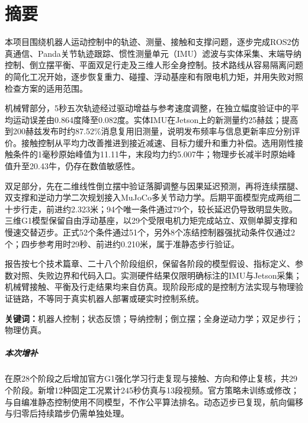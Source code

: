 \chapter*{摘要}
本项目围绕机器人运动控制中的轨迹、测量、接触和支撑问题，逐步完成ROS2仿真通信、Panda关节轨迹跟踪、惯性测量单元（IMU）滤波与实体采集、末端导纳控制、倒立摆平衡、平面双足行走及三维人形全身控制。技术路线从容易隔离问题的简化工况开始，逐步恢复重力、碰撞、浮动基座和有限电机力矩，并用失败对照检查方案的适用范围。

机械臂部分，5秒五次轨迹经过驱动增益与参考速度调整，在独立幅度验证中的平均运动误差由0.864度降至0.082度。实体IMU在Jetson上的新测量约25赫兹；提高到200赫兹发布时约87.52\%消息复用旧测量，说明发布频率与信息更新率应分别评价。接触控制从平均力改善推进到接近减速、目标力缓升和重力补偿。选用刚性接触条件的1毫秒原始峰值为11.11牛，末段均力约5.007牛；物理步长减半时原始峰值升至20.43牛，仍存在数值敏感性。

双足部分，先在二维线性倒立摆中验证落脚调整与因果延迟预测，再将连续摆腿、双支撑和逆动力学二次规划接入MuJoCo多关节动力学。后期平面模型完成两组二十步行走，前进约2.323米；94个唯一条件通过79个，较长延迟仍导致明显失败。三维G1模型保留自由浮动基座，以29个受限电机力矩完成站立、双侧单脚支撑和慢速交替迈步。正式52个条件通过51个，另外8个冻结控制器强扰动条件仅通过2个；四步参考用时29秒、前进约0.210米，属于准静态步行验证。

报告按七个技术篇章、二十八个阶段组织，保留各阶段的模型假设、指标定义、参数对照、失败边界和代码入口。实测硬件结果仅限明确标注的IMU与Jetson采集；机械臂接触、平衡及行走结果均来自仿真。现阶段形成的是控制方法实现与物理验证链路，不等同于真实机器人部署或硬实时控制系统。

\noindent\textbf{关键词：}机器人控制；状态反馈；导纳控制；倒立摆；全身逆动力学；双足步行；物理仿真。

\paragraph{本次增补}在原28个阶段之后增加官方G1强化学习行走复现与接触、方向和停止复核，共29个阶段。新增12种固定工况累计245秒仿真与13段视频。官方策略未训练或修改；与自编准静态控制使用不同模型，不作公平算法排名。动态迈步已复现，航向偏移与归零后持续踏步仍需单独处理。

